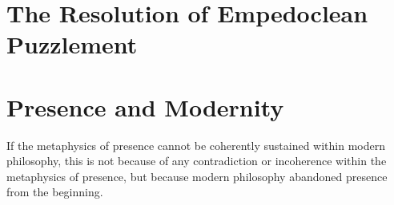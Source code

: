 \section{The Resolution of Empedoclean Puzzlement} %
\label{sec:the_resolution_of_empedoclean_puzzlement}




\section{Presence and Modernity} %
\label{sec:presence_and_modernity}

If the metaphysics of presence cannot be coherently sustained within modern philosophy, this is not because of any contradiction or incoherence within the metaphysics of presence, but because modern philosophy abandoned presence from the beginning. 


